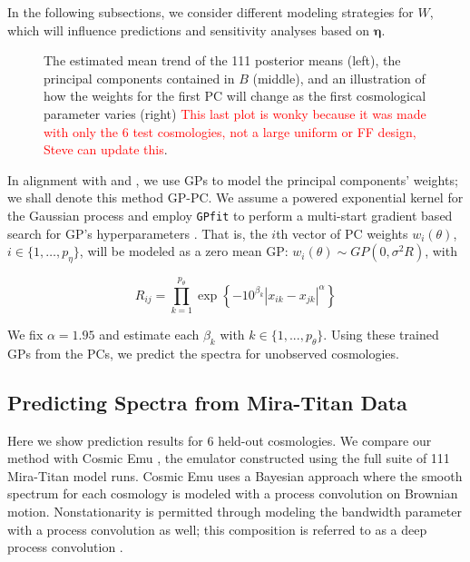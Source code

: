 \documentclass[11pt]{article}
\begin{document}
In the following subsections, we consider different modeling strategies for $W$, which will influence predictions and sensitivity analyses based on $\boldsymbol\eta$.

\begin{figure}
    \centering
    \caption{The estimated mean trend of the 111 posterior means (left), the principal components contained in $B$ (middle), and an illustration of how the weights for the first PC will change as the first cosmological parameter varies (right) \textcolor{red}{This last plot is wonky because it was made with only the 6 test cosmologies, not a large uniform or FF design, Steve can update this}.}
    \label{fig:mean_PCs_oneW}
\end{figure}


In alignment with \cite{heitmann2009coyote} and \cite{higdon2010estcosmo}, we use GPs to model the principal components' weights; we shall denote this method GP-PC. We assume a powered exponential kernel for the Gaussian process and employ \texttt{GPfit} to perform a multi-start gradient based search for GP's hyperparameters \citep{macdonald2015gpfit}. That is, the $i$th vector of PC weights $w_i(\theta)$, $i \in \{1,\ldots,p_\eta\}$, will be modeled as a zero mean GP: $w_i(\theta) \sim GP(0, \sigma^2R)$, with

\begin{equation*}
    R_{ij} = \prod_{k=1}^{p_\theta}\exp\left\{-10^{\beta_k}|x_{ik}-x_{jk}|^\alpha\right\}
\end{equation*}

We fix $\alpha=1.95$ and estimate each $\beta_k$ with $k \in \{1,...,p_\theta\}$. Using these trained GPs from the PCs, we predict the spectra for unobserved cosmologies.

\subsection{Predicting Spectra from Mira-Titan Data}
\label{subsec:mira_pred}

Here we show prediction results for 6 held-out cosmologies. We compare our method with Cosmic Emu \citep{moran2023mira}, the emulator constructed using the full suite of 111 Mira-Titan model runs. Cosmic Emu uses a Bayesian approach where the smooth spectrum for each cosmology is modeled with a process convolution on Brownian motion. Nonstationarity is permitted through modeling the bandwidth parameter with a process convolution as well; this composition is referred to as a deep process convolution \citep{moran2024dpc}.
\end{document}
